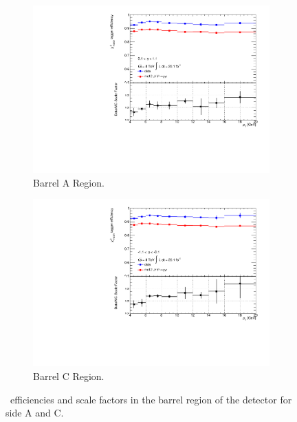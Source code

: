 \begin{figure}[htbp]
  \centering
    \begin{subfigure}[b]{0.85\textwidth}
        \includegraphics[width=\textwidth]{PartCalibration2012/Plots/SFPlots/Barrel_A_smt.pdf}
        \caption{Barrel A Region.}
      \label{fig:CalibrationScaleFactorBarrelA}
    \end{subfigure}
    
    \begin{subfigure}[b]{0.85\textwidth}
        \includegraphics[width=\textwidth]{PartCalibration2012/Plots/SFPlots/Barrel_C_smt.pdf}
        \caption{Barrel C Region.}
      \label{fig:CalibrationScaleFactorBarrelC}
    \end{subfigure}
    \caption[\xsm\ efficiencies and scale factors in the barrel region of the detector for side A and C.]{\xsm\ efficiencies and scale factors in the barrel region of the detector for side  A and  C.}
  \label{fig:CalibrationScaleFactorBarrel}
\end{figure}

